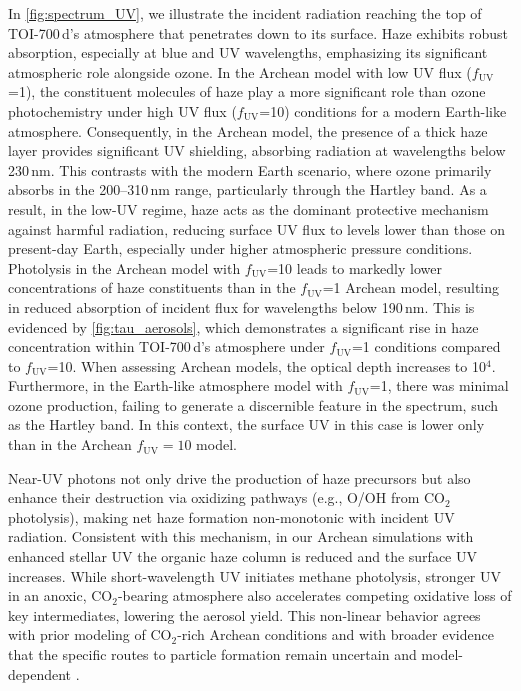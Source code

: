 In \autoref{fig:spectrum_UV}, we illustrate the incident radiation reaching the top of TOI-700\,d's atmosphere that penetrates down to its surface. Haze exhibits robust absorption, especially at blue and UV wavelengths, emphasizing its significant atmospheric role alongside ozone.
In the Archean model with low UV flux ($f_\mathrm{UV}$=1), the constituent molecules of haze play a more significant role than ozone photochemistry under high UV flux ($f_\mathrm{UV}$=10) conditions for a modern Earth-like atmosphere.  
Consequently, in the Archean model, the presence of a thick haze layer provides significant UV shielding, absorbing radiation at wavelengths below 230\,nm. This contrasts with the modern Earth scenario, where ozone primarily absorbs in the 200–310\,nm range, particularly through the Hartley band. As a result, in the low-UV regime, haze acts as the dominant protective mechanism against harmful radiation, reducing surface UV flux to levels lower than those on present-day Earth, especially under higher atmospheric pressure conditions.
Photolysis in the Archean model with $f_\mathrm{UV}$=10 leads to markedly lower concentrations of haze constituents than in the $f_\mathrm{UV}$=1 Archean model, resulting in reduced absorption of incident flux for wavelengths below 190\,nm.
This is evidenced by \autoref{fig:tau_aerosols}, which demonstrates a significant rise in haze concentration within TOI-700\,d's atmosphere under $f_\mathrm{UV}$=1 conditions compared to $f_\mathrm{UV}$=10. When assessing Archean models, the optical depth increases to 10$^4$.
Furthermore, in the Earth-like atmosphere model with $f_\mathrm{UV}$=1, there was minimal ozone production, failing to generate a discernible feature in the spectrum, such as the Hartley band. In this context, the surface UV in this case is lower only than in the Archean $f_{\mathrm{UV}}=10$ model.

Near-UV photons not only drive the production of haze precursors but also enhance their destruction via oxidizing pathways (e.g., O/OH from CO$_2$ photolysis), making net haze formation non-monotonic with incident UV radiation. Consistent with this mechanism, in our Archean simulations with enhanced stellar UV the organic haze column is reduced and the surface UV increases. While short-wavelength UV initiates methane photolysis, stronger UV in an anoxic, CO$_2$-bearing atmosphere also accelerates competing oxidative loss of key intermediates, lowering the aerosol yield. This non-linear behavior agrees with prior modeling of CO$_2$-rich Archean conditions \citep[e.g.,][]{Arney.et.al.2016AsBio..16..873A} and with broader evidence that the specific routes to particle formation remain uncertain and model-dependent \citep{Horst.2017JGRE..122..432H}.


